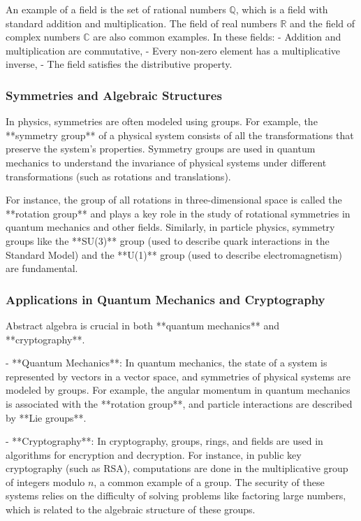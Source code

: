 \documentclass{article}
\begin{document}
An example of a field is the set of rational numbers \( \mathbb{Q} \), which is a field with standard addition and multiplication. The field of real numbers \( \mathbb{R} \) and the field of complex numbers \( \mathbb{C} \) are also common examples. In these fields:
- Addition and multiplication are commutative,
- Every non-zero element has a multiplicative inverse,
- The field satisfies the distributive property.

\subsubsection*{Symmetries and Algebraic Structures}

In physics, symmetries are often modeled using groups. For example, the **symmetry group** of a physical system consists of all the transformations that preserve the system's properties. Symmetry groups are used in quantum mechanics to understand the invariance of physical systems under different transformations (such as rotations and translations).

For instance, the group of all rotations in three-dimensional space is called the **rotation group** and plays a key role in the study of rotational symmetries in quantum mechanics and other fields. Similarly, in particle physics, symmetry groups like the **SU(3)** group (used to describe quark interactions in the Standard Model) and the **U(1)** group (used to describe electromagnetism) are fundamental.

\subsubsection*{Applications in Quantum Mechanics and Cryptography}

Abstract algebra is crucial in both **quantum mechanics** and **cryptography**.

- **Quantum Mechanics**: In quantum mechanics, the state of a system is represented by vectors in a vector space, and symmetries of physical systems are modeled by groups. For example, the angular momentum in quantum mechanics is associated with the **rotation group**, and particle interactions are described by **Lie groups**.
  
- **Cryptography**: In cryptography, groups, rings, and fields are used in algorithms for encryption and decryption. For instance, in public key cryptography (such as RSA), computations are done in the multiplicative group of integers modulo \( n \), a common example of a group. The security of these systems relies on the difficulty of solving problems like factoring large numbers, which is related to the algebraic structure of these groups.
\end{document}
